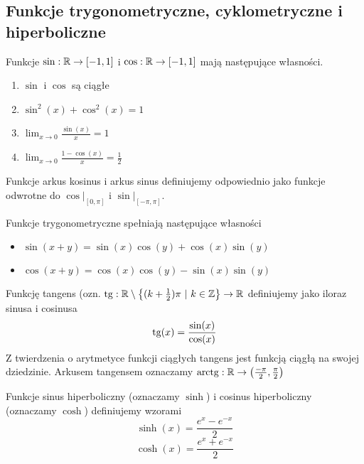 \documentclass[9pt]{article}
\begin{document}
\subsection{Funkcje trygonometryczne, cyklometryczne i hiperboliczne}

\begin{Twi}
    Funkcje $\sin: \mathbb{R} \to \left[-1, 1\right]$ i $\cos: \mathbb{R} \to \left[-1, 1\right]$ mają następujące
    własności.
    \begin{enumerate}
        \item $\sin$ i $\cos$ są ciągłe 
        \item $\sin^2(x) + \cos^2(x) = 1$
        \item $\lim_{x \to 0} \frac{\sin(x)}{x} = 1$
        \item $\lim_{x \to 0} \frac{1-\cos(x)}{x} = \frac{1}{2}$
    \end{enumerate}
\end{Twi}

Funkcje arkus kosinus i arkus sinus definiujemy odpowiednio jako funkcje odwrotne do
$\cos\vert_{\left[0,\pi\right]}$ i $\sin\vert_{\left[-\pi, \pi\right]}$.

\begin{Twi}
    Funkcje trygonometryczne spełniają następujące własności
    \begin{itemize}
        \item $\sin(x+y) = \sin(x)\cos(y) + \cos(x)\sin(y)$
        \item $\cos(x+y) = \cos(x)\cos(y) - \sin(x)\sin(y)$
    \end{itemize}
\end{Twi}

\begin{Def}
    Funkcję tangens (ozn. $\operatorname{tg}: \mathbb{R} \setminus \left\{(k+ \frac{1}{2})\pi \ |\  k \in \mathbb{Z}\right\}\to \mathbb{R}$
    definiujemy jako iloraz sinusa i cosinusa
    \[
        \operatorname{tg}(x) = \frac{\sin(x)}{\cos(x)}
    \]
    Z twierdzenia o arytmetyce funkcji ciągłych tangens jest funkcją ciągłą na swojej dziedzinie.
    Arkusem tangensem oznaczamy $\operatorname{arctg}: \mathbb{R} \to \left( \frac{-\pi}{2}, \frac{\pi}{2}\right)$
\end{Def}

\begin{Def}
    Funkcje sinus hiperboliczny (oznaczamy $\sinh$) i cosinus hiperboliczny (oznaczamy $\cosh$)
    definiujemy wzorami
    \[
        \sinh(x) = \frac{e^x - e^{-x}}{2}
    \]
    \[
        \cosh(x) = \frac{e^x + e^{-x}}{2}
    \]
\end{Def}
\end{document}
